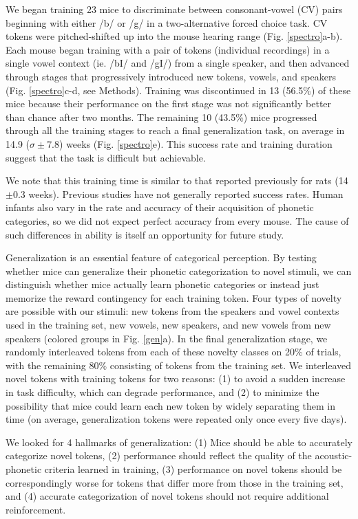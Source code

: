 We began training 23 mice to discriminate between consonant-vowel (CV) pairs beginning with either /b/ or /g/ in a two-alternative forced choice task. CV tokens were pitched-shifted up into the mouse hearing range (Fig. \ref{spectro}a-b). Each mouse began training with a pair of tokens (individual recordings) in a single vowel context (ie. /bI/ and /gI/) from a single speaker, and then advanced through stages that progressively introduced new tokens, vowels, and speakers (Fig. \ref{spectro}c-d, see Methods). Training was discontinued in 13 (56.5\%) of these mice because their performance on the first stage was not significantly better than chance after two months. The remaining 10 (43.5\%) mice progressed through all the training stages to reach a final generalization task, on average in 14.9 ($\sigma\pm 7.8$) weeks (Fig. \ref{spectro}e). This success rate and training duration suggest that the task is difficult but achievable. 

We note that this training time is similar to that reported previously for rats (14$\pm 0.3$ weeks\cite{Engineer2015}). Previous studies have not generally reported success rates. Human infants also vary in the rate and accuracy of their acquisition of phonetic categories\cite{Werker1988}, so we did not expect perfect accuracy from every mouse. The cause of such differences in ability is itself an opportunity for future study.

Generalization is an essential feature of categorical perception. By testing whether mice can generalize their phonetic categorization to novel stimuli, we can distinguish whether mice actually learn phonetic categories or instead just memorize the reward contingency for each training token. Four types of novelty are possible with our stimuli: new tokens from the speakers and vowel contexts used in the training set, new vowels, new speakers, and new vowels from new speakers (colored groups in Fig. \ref{gen}a). In the final generalization stage, we randomly interleaved tokens from each of these novelty classes on 20\% of trials, with the remaining 80\% consisting of tokens from the training set. We interleaved novel tokens with training tokens for two reasons: (1) to avoid a sudden increase in task difficulty, which can degrade performance, and (2) to minimize the possibility that mice could learn each new token by widely separating them in time (on average, generalization tokens were repeated only once every five days).

We looked for 4 hallmarks of generalization: (1) Mice should be able to accurately categorize novel tokens, (2) performance should reflect the quality of the acoustic-phonetic criteria learned in training, (3) performance on novel tokens should be correspondingly worse for tokens that differ more from those in the training set, and (4) accurate categorization of novel tokens should not require additional reinforcement.

